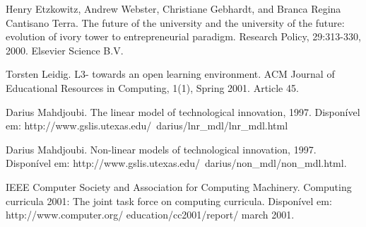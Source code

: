 \documentclass[
	12pt,				%
	openright,			%
  oneside,     %
	a4paper,			%
	chapter=TITLE,		%
	english,			%
	french,				%
	spanish,			%
	brazil				%
	]{abntex2}
\begin{document}
\noindent Henry Etzkowitz, Andrew Webster, Christiane Gebhardt, and Branca Regina Cantisano Terra. The future of the university and the university of the future: evolution of ivory tower to entrepreneurial paradigm. Research Policy, 29:313-330, 2000. Elsevier Science B.V.

\noindent Torsten Leidig. L3- towards an open learning environment. ACM Journal of Educational Resources in Computing, 1(1), Spring 2001. Article 45.

\noindent Darius Mahdjoubi. The linear model of technological innovation, 1997. Disponível em: http://www.gslis.utexas.edu/~darius/lnr\_mdl/lnr\_mdl.html

\noindent Darius Mahdjoubi. Non-linear models of technological innovation, 1997. Disponível em: http://www.gslis.utexas.edu/~darius/non\_mdl/non\_mdl.html.

\noindent IEEE Computer Society and Association for Computing Machinery. Computing curricula 2001: The joint task force on computing curricula.  Disponível em: http://www.computer.org/ education/cc2001/report/ march 2001.
%
%

\end{document}
